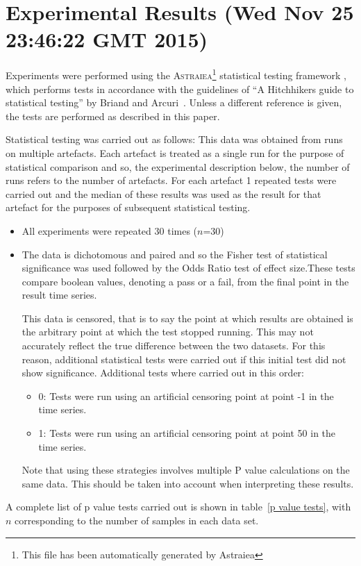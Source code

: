 \documentclass[]{article}
\begin{document}
\section{Experimental Results (Wed Nov 25 23:46:22 GMT 2015)}
Experiments were performed using the \textsc{Astraiea}\footnote{This file has been automatically generated by Astraiea} statistical testing framework \cite{Neumann:2014:EET:2598394.2609850},
which performs tests in accordance with the guidelines of ``A Hitchhikers guide to statistical testing''
by Briand and Arcuri~\cite{Arcuri2012}.
Unless a different reference is given, the tests are performed as described in this paper.

Statistical testing was carried out as follows: 
This data was obtained from runs on multiple artefacts. Each artefact is treated as a single run for the purpose of statistical comparison and so, the experimental description below,  the number of runs refers to the number of artefacts. For each artefact 1 repeated tests were carried out and the median of these results was used as the result for that artefact for the purposes of subsequent statistical testing.\begin{itemize}
\item{All experiments were repeated 30 times ($n$=30)}
\item{The data is dichotomous and paired and so the Fisher test of statistical significance was used followed by the Odds Ratio test of effect size.These tests compare boolean values, denoting a pass or a fail, from the final point in the result time series. 

This data is censored, that is to say the point at which results are obtained is the arbitrary point at which the test stopped running. This may not accurately reflect the true difference between the two datasets. For this reason, additional statistical tests were carried out if this initial test did not show significance. Additional tests where carried out in this order:
\begin{itemize}
\item{0: Tests were run using an artificial censoring point at point -1 in the time series.}
\item{1: Tests were run using an artificial censoring point at point 50 in the time series.}
\end{itemize}Note that using these strategies involves multiple P value calculations on the same data. This should be taken into account when interpreting these results.
}
\end{itemize}A complete list of p value tests carried out is shown in table~\ref{p value tests}, with $n$ corresponding to the number of samples in each data set.
\end{document}
